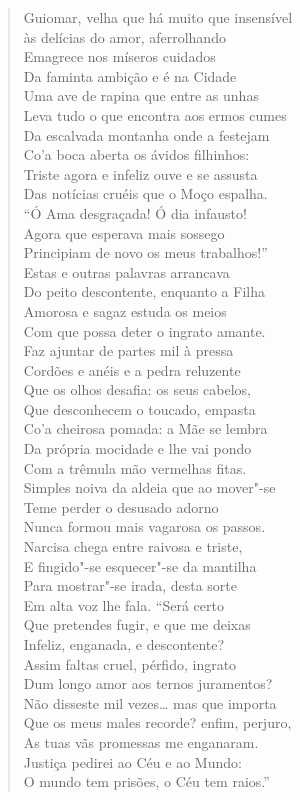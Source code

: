 \begin{verse}
Guiomar, velha que há muito que insensível\\
às delícias do amor, aferrolhando\\
Emagrece nos míseros cuidados\\
Da faminta ambição e é na Cidade\\
Uma ave de rapina que entre as unhas\\
Leva tudo o que encontra aos ermos cumes\\
Da escalvada montanha onde a festejam\\
Co'a boca aberta os ávidos filhinhos:\\
Triste agora e infeliz ouve e se assusta\\
Das notícias cruéis que o Moço espalha.\\
``Ó Ama desgraçada! Ó dia infausto!\\ 
Agora que esperava mais sossego\\
Principiam de novo os meus trabalhos!''\\
Estas e outras palavras arrancava\\
Do peito descontente, enquanto a Filha\\
Amorosa e sagaz estuda os meios\\
Com que possa deter o ingrato amante.\\ 	\index{\Tipos}
Faz ajuntar de partes mil à pressa\\
Cordões e anéis e a pedra reluzente\\
Que os olhos desafia: os seus cabelos,\\
Que desconhecem o toucado, empasta\\
Co'a cheirosa pomada: a Mãe se lembra\\
Da própria mocidade e lhe vai pondo\\
Com a trêmula mão vermelhas fitas.\\
Simples noiva da aldeia que ao mover"-se\\
Teme perder o desusado adorno\\
Nunca formou mais vagarosa os passos.\\
Narcisa chega entre raivosa e triste,\\
E fingido"-se esquecer"-se da mantilha\\
Para mostrar"-se irada, desta sorte\\
Em alta voz lhe fala. ``Será certo\\
Que pretendes fugir, e que me deixas\\
Infeliz, enganada, e descontente?\\
Assim faltas cruel, pérfido, ingrato\\
Dum longo amor aos ternos juramentos?\\ 
Não disseste mil vezes\ldots{} mas que importa\\
Que os meus males recorde? enfim, perjuro,\\
As tuas vãs promessas me enganaram.\\
Justiça pedirei ao Céu e ao Mundo:\\ %
O mundo tem prisões, o Céu tem raios.'' \\[10pt]



\end{verse}
